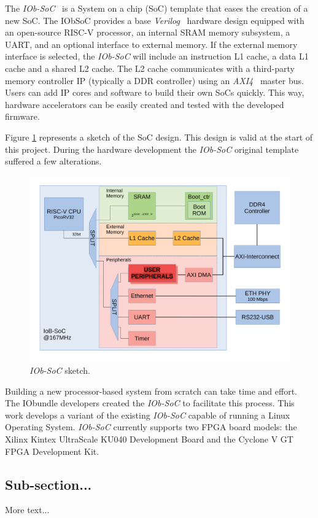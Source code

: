 The \textit{IOb-SoC}~\cite{iob_soc} is a System on a chip (SoC) template that eases the creation of a new SoC. The IObSoC provides a base \textit{Verilog}~\cite{thomas2008verilog} hardware design equipped with an open-source RISC-V processor, an internal SRAM memory subsystem, a UART, and an optional interface to external memory. If the external memory interface is selected, the \textit{IOb-SoC} will include an instruction L1 cache, a data L1 cache and a shared L2 cache. The L2 cache communicates with a third-party memory controller IP (typically a DDR controller) using an \textit{AXI4}~\cite{tidala2018high} master bus. Users can add IP cores and software to build their own SoCs quickly. This way, hardware accelerators can be easily created and tested with the developed firmware.

Figure \ref{fig:bd_original} represents a sketch of the SoC design. This design is valid at the start of this project. During the hardware development the \textit{IOb-SoC} original template suffered a few alterations.

\begin{figure}[!ht]
  \centering
  \includegraphics[width=\linewidth]{images/bd_original.pdf}
  \caption{\textit{IOb-SoC} sketch.}
  \label{fig:bd_original}
\end{figure}

Building a new processor-based system from scratch can take time and effort. The IObundle developers created the \textit{IOb-SoC} to facilitate this process. This work develops a variant of the existing \textit{IOb-SoC} capable of running a Linux Operating System. \textit{IOb-SoC} currently supports two FPGA board models: the Xilinx Kintex UltraScale KU040 Development Board and the Cyclone V GT FPGA Development Kit.


\subsection{Sub-section...}

More text...
